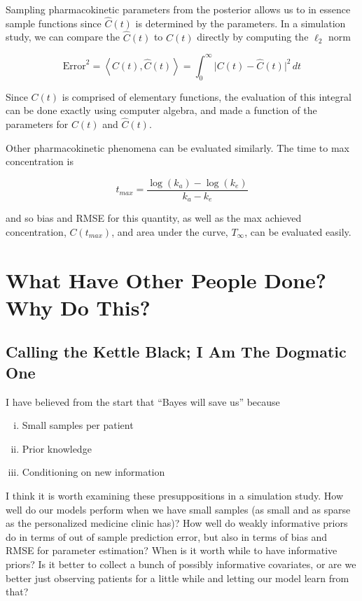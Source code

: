 \documentclass[12pt,a4paper]{book}
\begin{document}
Sampling pharmacokinetic parameters from the posterior allows us to in essence sample functions since $ \hat{C}(t) $ is determined by the parameters. In a simulation study, we can compare the $ \hat{C}(t) $ to $ C(t) $ directly by computing the $ \ell_2 $ norm

\begin{equation}
 \mbox{Error}^2 = \left<C(t), \hat{C}(t)\right> = \int_{0}^\infty \lvert  C(t) - \hat{C}(t)\rvert^2 \, dt
\end{equation}

\noindent Since $ C(t) $ is comprised of elementary functions, the evaluation of this integral can be done exactly using computer algebra, and made a function of the parameters for $ C(t) $ and $ \hat{C}(t) $.

Other pharmacokinetic phenomena can be evaluated similarly.  The time to max concentration is 


\begin{equation}
t_{max} = \dfrac{\log(k_a) - \log(k_e)}{k_a - k_e}
\end{equation}

\noindent and so bias and RMSE for this quantity, as well as the max achieved  concentration, $ C(t_{max}) $, and area under the curve, $ T_\infty $,  can be evaluated easily.


\section{What Have Other People Done?  Why Do This?}


\subsection{Calling the Kettle Black; I Am The Dogmatic One}
I have believed from the start that ``Bayes will save us'' because 

\begin{enumerate}[i)]
 \item Small samples per patient
 \item Prior knowledge
 \item Conditioning on new information
\end{enumerate}

I think it is worth examining these presuppositions in a simulation study.  How well do our models perform when we have small samples (as small and as sparse as the personalized medicine clinic has)?  How well do weakly informative priors do in terms of out of sample prediction error, but also in terms of bias and RMSE for parameter estimation? When is it worth while to have informative priors? Is it better to collect a bunch of possibly informative covariates, or are we better just observing patients for a little while and letting our model learn from that?
\end{document}
